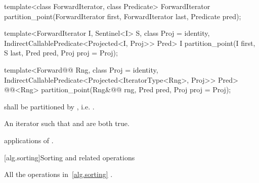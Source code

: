 %
\begin{removedblock}
\begin{itemdecl}
template<class ForwardIterator, class Predicate>
  ForwardIterator partition_point(ForwardIterator first,
                                  ForwardIterator last,
                                  Predicate pred);
\end{itemdecl}
\end{removedblock}
\begin{addedblock}
\begin{itemdecl}
template<ForwardIterator I, Sentinel<I> S, class Proj = identity,
    IndirectCallablePredicate<Projected<I, Proj>> Pred>
  I partition_point(I first, S last, Pred pred, Proj proj = Proj{});

template<Forward@@ Rng, class Proj = identity,
    IndirectCallablePredicate<Projected<IteratorType<Rng>, Proj>> Pred>
  @@<Rng>
    partition_point(Rng&@\newtxt{\&}@ rng, Pred pred, Proj proj = Proj{});
\end{itemdecl}
\end{addedblock}

\begin{itemdescr}
\pnum
\requires {} shall be partitioned by , i.e.
.

\pnum
\returns An iterator  such that  and
 are both true.

\pnum
\complexity {} applications of .
\end{itemdescr}


[alg.sorting]{Sorting and related operations}

\pnum
All the operations in~\ref{alg.sorting} .

